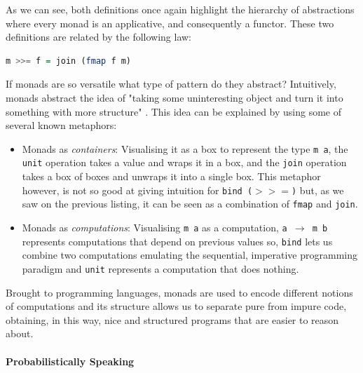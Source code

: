 \documentclass[
  oneside,
  11pt, a4paper,
  footinclude=true,
  headinclude=true,
  cleardoublepage=empty
]{scrbook}
\theoremstyle{definition}
\theoremstyle{definition}
\begin{document}
	            As we can see, both definitions once again highlight the hierarchy of abstractions where every monad is an applicative, and consequently a functor. These two definitions are related by the following law:
	            
	            \begin{lstlisting}[language=Haskell, caption={Relation between \texttt{join} and \texttt{bind}},captionpos=b]
	                    m >>= f = join (fmap f m) 
	            \end{lstlisting}{}
	            
	            If monads are so versatile what type of pattern do they abstract? Intuitively, monads abstract the idea of "taking some uninteresting object and turn it into something with more structure" \citep{DBLP:journals/corr/abs-1803-10195}. This idea can be explained by using some of several known metaphors:
	            
	            \begin{itemize}
	                \item Monads as \emph{containers}: Visualising it as a box to represent the type \texttt{m a}, the \texttt{unit} operation takes a value and wraps it in a box, and the \texttt{join} operation takes a box of boxes and unwraps it into a single box. This metaphor however, is not so good at giving intuition for \texttt{bind ($>>=$)} but, as we saw on the previous listing, it can be seen as a combination of \texttt{fmap} and \texttt{join}.
	                
	                \item Monads as \emph{computations}: Visualising \texttt{m a} as a computation, \texttt{a $\rightarrow$ m b} represents computations that depend on previous values so, \texttt{bind} lets us combine two computations emulating the sequential, imperative programming paradigm and \texttt{unit} represents a computation that does nothing.
	            \end{itemize}{}
	            
	            Brought to programming languages, monads are used to encode different notions of computations and its structure allows us to separate pure from impure code, obtaining, in this way, nice and structured programs that are easier to reason about. 
	        \paragraph{Probabilistically Speaking}
	            
\end{document}
